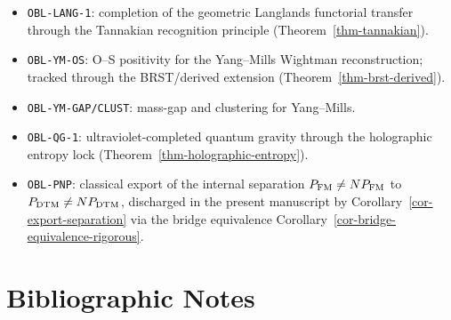 \begin{itemize}
\item \texttt{OBL-LANG-1}: completion of the geometric Langlands functorial transfer through the Tannakian recognition principle (Theorem~\ref{thm-tannakian}).
\item \texttt{OBL-YM-OS}: O--S positivity for the Yang--Mills Wightman reconstruction; tracked through the BRST/derived extension (Theorem~\ref{thm-brst-derived}).
\item \texttt{OBL-YM-GAP/CLUST}: mass-gap and clustering for Yang--Mills.
\item \texttt{OBL-QG-1}: ultraviolet-completed quantum gravity through the holographic entropy lock (Theorem~\ref{thm-holographic-entropy}).
\item \texttt{OBL-PNP}: classical export of the internal separation $P_{\mathrm{FM}} \neq NP_{\mathrm{FM}}$ to $P_{\mathrm{DTM}} \neq NP_{\mathrm{DTM}}$, discharged in the present manuscript by Corollary~\ref{cor-export-separation} via the bridge equivalence Corollary~\ref{cor-bridge-equivalence-rigorous}.
\end{itemize}

\section{Bibliographic Notes}


